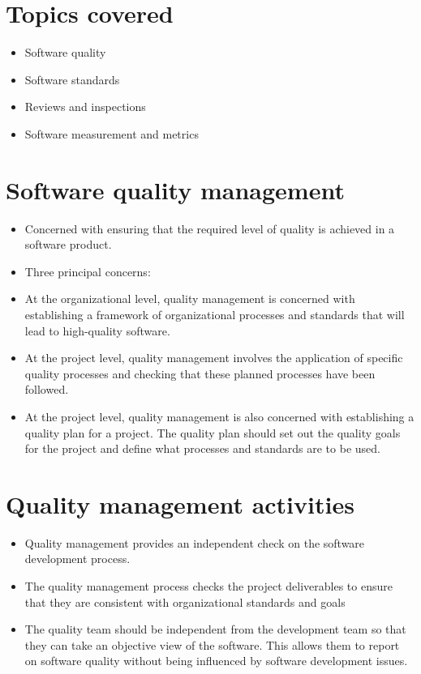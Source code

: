 \section {Topics covered}
\begin{itemize}

\item Software quality

\item Software standards

\item Reviews and inspections

\item Software measurement and metrics

\end{itemize}
\section {Software quality management}
\begin{itemize}

\item Concerned with ensuring that the required level of quality is achieved in a software product.

\item Three principal concerns:

  \item At the organizational level, quality management is concerned with establishing a framework of organizational processes and standards that will lead to high-quality software.
  \item At the project level, quality management involves the application of specific quality processes and checking that these planned processes have been followed.
  \item At the project level, quality management is also concerned with establishing a quality plan for a project. The quality plan should set out the quality goals for the project and define what processes and standards are to be used.

\end{itemize}
\section {Quality management activities}
\begin{itemize}




\item Quality management provides an independent check on the software development process.

\item The quality management process checks the project deliverables to ensure that they are consistent with organizational standards and goals

\item The quality team should be independent from the development team so that they can take an objective view of the software. This allows them to report on software quality without being influenced by software development issues.

\end{itemize}


